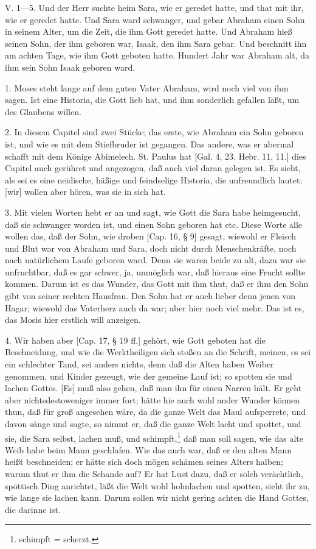 V. 1—5. Und der Herr suchte heim Sara, wie er geredet hatte, und that mit ihr, wie er geredet hatte. Und Sara ward schwanger, und gebar Abraham einen Sohn in seinem Alter, um die Zeit, die ihm Gott geredet hatte. Und Abraham hieß seinen Sohn, der ihm geboren war, Isaak, den ihm Sara gebar. Und beschnitt ihn am achten Tage, wie ihm Gott geboten hatte. Hundert Jahr war Abraham alt, da ihm sein Sohn Isaak geboren ward.

1. Moses steht lange auf dem guten Vater Abraham, wird noch viel von ihm sagen. Ist eine Historia, die Gott lieb hat, und ihm sonderlich gefallen läßt, um des Glaubens willen.

2. In diesem Capitel sind zwei Stücke; das erste, wie Abraham ein Sohn geboren ist, und wie es mit dem Stiefbruder ist gegangen. Das andere, was er abermal schafft mit dem Könige Abimelech. St. Paulus hat [Gal. 4, 23. Hebr. 11, 11.] dies Capitel auch gerühret und angezogen, daß auch viel daran gelegen ist. Es sieht, als sei es eine neidische, häßige und feindselige Historia, die unfreundlich lautet; [wir] wollen aber hören, was sie in sich hat.

3. Mit vielen Worten hebt er an und sagt, wie Gott die Sara habe heimgesucht, daß sie schwanger worden ist, und einen Sohn geboren hat etc. Diese Worte alle wollen das, daß der Sohn, wie droben [Cap. 16, § 9] gesagt, wiewohl er Fleisch und Blut war von Abraham und Sara, doch nicht durch Menschenkräfte, noch
nach natürlichem Laufe geboren ward. Denn sie waren beide zu alt, dazu war sie unfruchtbar, daß es gar schwer, ja, unmöglich war, daß hieraus eine Frucht sollte kommen. Darum ist es das Wunder, das Gott mit ihm thut, daß er ihm den Sohn gibt von seiner rechten Hausfrau. Den Sohn hat er auch lieber denn jenen von Hagar; wiewohl das Vaterherz auch da war; aber hier noch viel mehr. Das ist es, das Mosis hier erstlich will anzeigen.

4. Wir haben aber [Cap. 17, § 19 ff.] gehört, wie Gott geboten hat die Beschneidung, und wie die Werktheiligen sich stoßen an die Schrift, meinen, es sei ein schlechter Tand, sei anders nichts, denn daß die Alten haben Weiber genommen, und Kinder gezeugt, wie der gemeine Lauf ist; so spotten sie und lachen Gottes. [Es] muß also gehen, daß man ihn für einen Narren hält. Er geht aber nichtsdestoweniger immer fort; hätte hie auch wohl ander Wunder können thun, daß für groß angesehen wäre, da die ganze Welt das Maul aufsperrete, und davon sänge und sagte, so nimmt er, daß die ganze Welt lacht und spottet, und sie, die Sara selbst, lachen muß, und schimpft,\footnote{schimpft = scherzt.} daß man soll sagen, wie das alte Weib habe beim Mann geschlafen. Wie das auch war, daß er den alten Mann heißt beschneiden; er hätte sich doch mögen schämen seines Alters halben; warum thut er ihm die Schande auf? Er hat Lust dazu, daß er solch verächtlich, spöttisch Ding anrichtet, läßt die Welt wohl hohnlachen und spotten, sieht ihr zu, wie lange sie lachen kann. Darum sollen wir nicht gering achten die Hand Gottes, die darinne ist.

